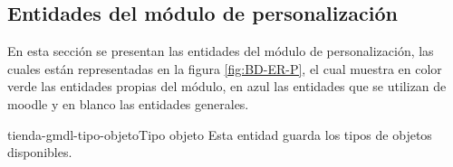 
\clearpage
\subsection{Entidades del módulo de personalización}

 En esta sección se presentan las entidades del módulo de personalización,
 las cuales están representadas en la figura  \ref{fig:BD-ER-P},
 el cual muestra en color verde las entidades propias del módulo,
 en azul las entidades que se utilizan de moodle  y en blanco las entidades generales.


        \begin{cdtEntidad}{tienda-gmdl-tipo-objeto}{Tipo objeto}{
            Esta entidad guarda los tipos de objetos disponibles.
            }



        \end{cdtEntidad}


